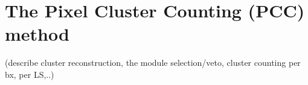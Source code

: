 \section{The Pixel Cluster Counting (PCC) method}
\label{sec:pcc}
(describe cluster reconstruction, the module selection/veto, cluster counting per bx, per LS,..)
